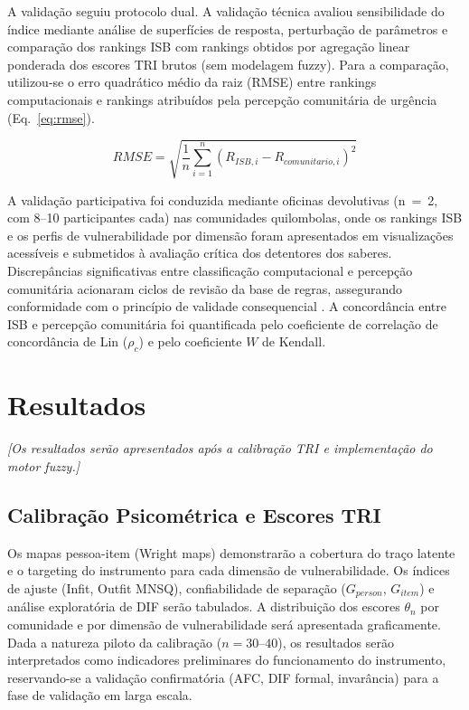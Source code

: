 \documentclass[pdflatex,sn-basic]{sn-jnl}%
\theoremstyle{thmstyleone}%
\theoremstyle{thmstyletwo}%
\theoremstyle{thmstylethree}%
\begin{document}
A validação seguiu protocolo dual. A validação técnica avaliou sensibilidade do índice mediante análise de superfícies de resposta, perturbação de parâmetros e comparação dos rankings ISB com rankings obtidos por agregação linear ponderada dos escores TRI brutos (sem modelagem fuzzy). Para a comparação, utilizou-se o erro quadrático médio da raiz (RMSE) entre rankings computacionais e rankings atribuídos pela percepção comunitária de urgência (Eq.~\ref{eq:rmse}).

\begin{equation}
RMSE = \sqrt{\frac{1}{n}\sum_{i=1}^{n}(R_{ISB,i} - R_{comunitario,i})^2}
\label{eq:rmse}
\end{equation}

A validação participativa foi conduzida mediante oficinas devolutivas (n~=~2, com 8--10 participantes cada) nas comunidades quilombolas, onde os rankings ISB e os perfis de vulnerabilidade por dimensão foram apresentados em visualizações acessíveis e submetidos à avaliação crítica dos detentores dos saberes. Discrepâncias significativas entre classificação computacional e percepção comunitária acionaram ciclos de revisão da base de regras, assegurando conformidade com o princípio de validade consequencial \citep{Messick1995}. A concordância entre ISB e percepção comunitária foi quantificada pelo coeficiente de correlação de concordância de Lin ($\rho_c$) e pelo coeficiente $W$ de Kendall.


\section{Resultados}\label{sec:resultados}

\textit{[Os resultados serão apresentados após a calibração TRI e implementação do motor fuzzy.]}

\subsection{Calibração Psicométrica e Escores TRI}\label{subsec:res_tri}

Os mapas pessoa-item (Wright maps) demonstrarão a cobertura do traço latente e o targeting do instrumento para cada dimensão de vulnerabilidade. Os índices de ajuste (Infit, Outfit MNSQ), confiabilidade de separação ($G_{person}$, $G_{item}$) e análise exploratória de DIF serão tabulados. A distribuição dos escores $\theta_n$ por comunidade e por dimensão de vulnerabilidade será apresentada graficamente. Dada a natureza piloto da calibração ($n = 30$--$40$), os resultados serão interpretados como indicadores preliminares do funcionamento do instrumento, reservando-se a validação confirmatória (AFC, DIF formal, invarância) para a fase de validação em larga escala.
\end{document}
